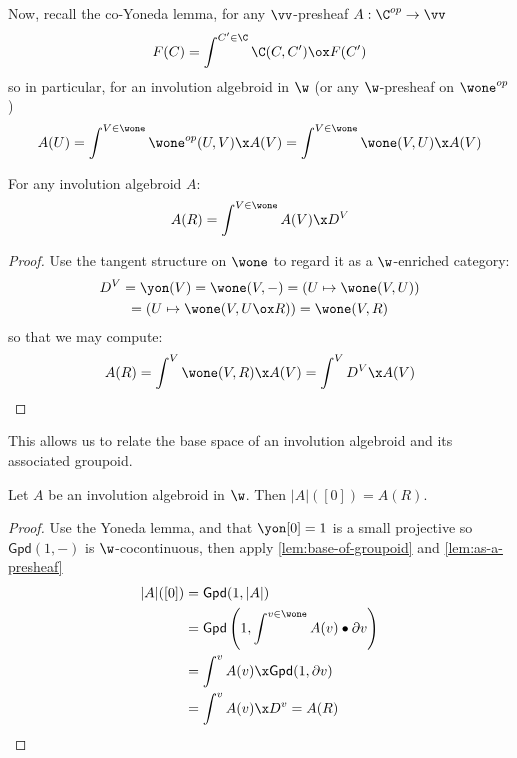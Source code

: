 Now, recall the co-Yoneda lemma, for any $\vv$-presheaf $A: \C^{op} \to \vv$
\[
	F(C) = \int^{C' \in \C} \C(C,C') \ox F(C')
\]
so in particular, for an involution algebroid in $\w$ (or any $\w$-presheaf on $\wone^{op}$)
\[
	A(U) = \int^{V \in \wone} \wone^{op}(U,V) \x A(V) = \int^{V \in \wone} \wone(V,U) \x A(V) 
\]
\begin{lemma}\label{lem:as-a-presheaf}
	For any involution algebroid $A$:
	\[ A(R) = \int^{V \in \wone} A(V) \x D^V \]
\end{lemma}
\begin{proof}
	Use the tangent structure on $\wone$ to regard it as a $\w$-enriched category:
	\begin{gather*}
		D^V = \yon(V) = \wone(V,-) = (U \mapsto \wone(V, U))  \\= (U \mapsto \wone(V, U\ox R)) = \wone(V,R)
	\end{gather*}
	so that we may compute:
	\[
		A(R) = \int^{V} \wone(V,R) \x A(V) = \int^{V} D^V \x A(V) 
	\]
\end{proof}
This allows us to relate the base space of an involution algebroid and its associated groupoid. 

\begin{proposition}\label{prop:lie-int-first-part}
	Let $A$ be an involution algebroid in $\w$. Then $|A|([0]) = A(R)$.
\end{proposition}
\begin{proof}
	Use the Yoneda lemma, and that $\yon[0] = 1$ is a small projective so $\mathsf{Gpd}(1,-)$ is $\w$-cocontinuous, then apply \cref{lem:base-of-groupoid} and \cref{lem:as-a-presheaf}
	\begin{align*}
		|A|([0])&= \mathsf{Gpd}(1, |A|) \\
			    &= \mathsf{Gpd}\left(1, \int^{v \in \wone} A(v)\bullet \partial v \right) \\
			    &= \int^{v} A(v)\x \mathsf{Gpd}(1,  \partial v ) \\
			    &= \int^{v}  A(v)\x D^v = A(R)
	\end{align*}
\end{proof}

